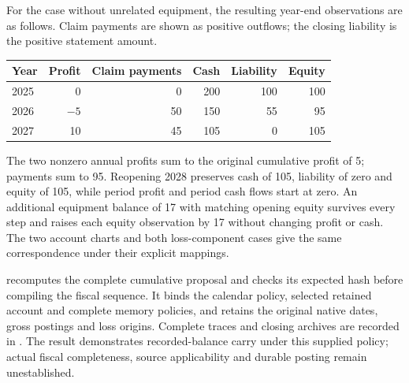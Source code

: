 For the case without unrelated equipment, the resulting year-end observations
are as follows. Claim payments are shown as positive outflows; the closing
liability is the positive statement amount.
\begin{center}\small
\begin{tabular}{lrrrrr}
\toprule
Year & Profit & Claim payments & Cash & Liability & Equity \\
\midrule
2025 & 0 & 0 & 200 & 100 & 100 \\
2026 & $-5$ & 50 & 150 & 55 & 95 \\
2027 & 10 & 45 & 105 & 0 & 105 \\
\bottomrule
\end{tabular}
\end{center}
The two nonzero annual profits sum to the original cumulative profit of 5;
payments sum to 95. Reopening 2028 preserves cash of 105, liability of zero
and equity of 105, while period profit and period cash flows start at zero.
An additional equipment balance of 17 with matching opening equity survives
every step and raises each equity observation by 17 without changing profit
or cash. The two account charts and both loss-component cases give the same
correspondence under their explicit mappings.

 recomputes the complete cumulative proposal and
checks its expected hash before compiling the fiscal sequence. It binds the
calendar policy, selected retained account and complete memory policies, and
retains the original native dates, gross postings and loss origins. Complete
traces and closing archives are recorded in
.
The result demonstrates recorded-balance carry under this supplied policy;
actual fiscal completeness, source applicability and durable posting remain
unestablished.
